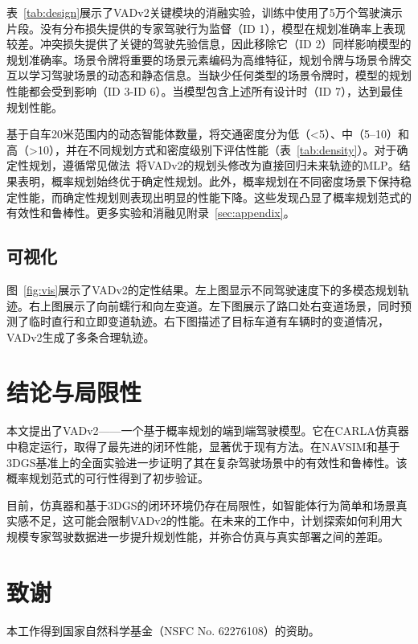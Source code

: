 \documentclass{article} %
\newcommand{\boldparagraph}[1]{\vspace{0.2cm}\noindent{\bf #1}}
\def\thename{VADv2\xspace}
\begin{document}
\boldparagraph{关键模块。}
表~\ref{tab:design}展示了\thename{}关键模块的消融实验，训练中使用了5万个驾驶演示片段。没有分布损失提供的专家驾驶行为监督（ID 1），模型在规划准确率上表现较差。冲突损失提供了关键的驾驶先验信息，因此移除它（ID 2）同样影响模型的规划准确率。场景令牌将重要的场景元素编码为高维特征，规划令牌与场景令牌交互以学习驾驶场景的动态和静态信息。当缺少任何类型的场景令牌时，模型的规划性能都会受到影响（ID 3-ID 6）。当模型包含上述所有设计时（ID 7），达到最佳规划性能。

\vspace{-1mm}
\boldparagraph{规划鲁棒性。}
基于自车20米范围内的动态智能体数量，将交通密度分为低（<5）、中（5–10）和高（>10），并在不同规划方式和密度级别下评估性能（表~\ref{tab:density}）。对于确定性规划，遵循常见做法~\citep{vad}将VADv2的规划头修改为直接回归未来轨迹的MLP。结果表明，概率规划始终优于确定性规划。此外，概率规划在不同密度场景下保持稳定性能，而确定性规划则表现出明显的性能下降。这些发现凸显了概率规划范式的有效性和鲁棒性。更多实验和消融见附录~\ref{sec:appendix}。


\subsection{可视化}
图~\ref{fig:vis}展示了\thename{}的定性结果。左上图显示不同驾驶速度下的多模态规划轨迹。右上图展示了向前蠕行和向左变道。左下图展示了路口处右变道场景，同时预测了临时直行和立即变道轨迹。右下图描述了目标车道有车辆时的变道情况，\thename{}生成了多条合理轨迹。


\vspace{-1mm}
\section{结论与局限性}
\vspace{-1mm}
\label{sec:conclusion}
本文提出了\thename{}——一个基于概率规划的端到端驾驶模型。它在CARLA仿真器中稳定运行，取得了最先进的闭环性能，显著优于现有方法。在NAVSIM和基于3DGS基准上的全面实验进一步证明了其在复杂驾驶场景中的有效性和鲁棒性。该概率规划范式的可行性得到了初步验证。

目前，仿真器和基于3DGS的闭环环境仍存在局限性，如智能体行为简单和场景真实感不足，这可能会限制VADv2的性能。在未来的工作中，计划探索如何利用大规模专家驾驶数据进一步提升规划性能，并弥合仿真与真实部署之间的差距。


\section*{致谢}
本工作得到国家自然科学基金（NSFC No. 62276108）的资助。
\end{document}
